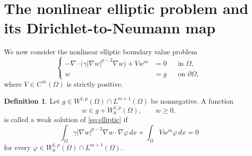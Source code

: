 \documentclass[a4paper,12pt]{article}
\newcommand{\pr}{\partial}
\theoremstyle{definition}
\newtheorem{dfn}[thm]{Definition}
\theoremstyle{remark}
\begin{document}
\section{The nonlinear elliptic problem and its Dirichlet-to-Neumann map}\label{sec:elliptic-forward}

We now consider the nonlinear elliptic boundary value problem
\begin{equation}\label{eq:elliptic}
\left\{
\begin{aligned}
-\nabla\cdot\bigl(\gamma|\nabla w|^{p-2}\nabla w\bigr)+Vw^m&=0 &&\text{in }\Omega,\\
w&=g &&\text{on }\pr\Omega,
\end{aligned}
\right.
\end{equation}
where $V\in C^\infty(\Omega)$ is strictly positive.

\begin{dfn}\label{def:elliptic-weak}
Let $g\in W^{1,p}(\Omega)\cap L^{m+1}(\Omega)$ be nonnegative. A function
\[
w\in g+W^{1,p}_0(\Omega),\qquad w\ge0,
\]
is called a weak solution of \eqref{eq:elliptic} if
\begin{equation}\label{eq:weak-elliptic}
\int_\Omega \gamma|\nabla w|^{p-2}\nabla w\cdot\nabla\varphi\,dx
+\int_\Omega Vw^m\varphi\,dx=0
\end{equation}
for every $\varphi\in W^{1,p}_0(\Omega)\cap L^{m+1}(\Omega)$.
\end{dfn}
\end{document}
